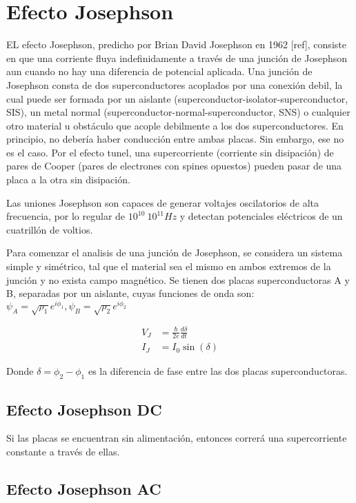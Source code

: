 \section{Efecto Josephson}

EL efecto Josephson, predicho por Brian David Josephson en 1962 [ref], consiste en que una corriente fluya indefinidamente a través de una junción de Josephson aun cuando no hay una diferencia de potencial aplicada. Una junción de Josephson consta de dos superconductores acoplados por una conexión debil, la cual puede ser formada por un aislante (superconductor-isolator-superconductor, SIS), un metal normal (superconductor-normal-superconductor, SNS) o cualquier otro material u obstáculo que acople debilmente a los dos superconductores. En principio, no debería haber conducción entre ambas placas.  Sin embargo, ese no es el caso. Por el efecto tunel, una supercorriente (corriente sin disipación) de pares de Cooper (pares de electrones con spines opuestos) pueden pasar de una placa a la otra sin disipación.

Las uniones Josephson son capaces de generar voltajes oscilatorios de alta frecuencia, por lo regular de $10^{10} ~ 10^{11} Hz$ y detectan potenciales eléctricos de un cuatrillón de voltios.

Para comenzar el analisis de una junción de Josephson, se considera un sistema simple y simétrico, tal que el material sea el mismo en ambos extremos de la junción y no exista campo magnético. Se tienen dos placas superconductoras A y B, separadas por un aislante, cuyas funciones de onda son: $\psi_A = \sqrt{\rho_1} e^{i \phi_1}, \psi_B = \sqrt{\rho_2} e^{i \phi_2}$ 


\begin{align}
    V_J &= \frac{\hbar}{2e} \frac{d\delta}{dt} \\
    I_J &= I_0 \sin(\delta)
\end{align}

Donde $\delta=\phi_2-\phi_1$ es la diferencia de fase entre las dos placas superconductoras.

\subsection{Efecto Josephson DC}

Si las placas se encuentran sin alimentación, entonces correrá una supercorriente constante a través de ellas.

\subsection{Efecto Josephson AC}


